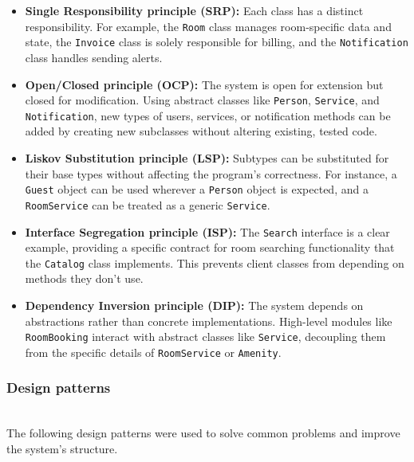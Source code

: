 \begin{itemize}
\item
\protect{}\label{SnXnbR9LHmyjL7LACTn7e}
\textbf{Single Responsibility principle (SRP):} Each class has a distinct responsibility. For example, the \texttt{Room} class manages room-specific data and state, the \texttt{Invoice} class is solely responsible for billing, and the \texttt{Notification} class handles sending alerts.
\item
\protect{}\label{GHGQq7Lh6XFKvBKaSGGWI}
\textbf{Open/Closed principle (OCP):} The system is open for extension but closed for modification. Using abstract classes like \texttt{Person}, \texttt{Service}, and \texttt{Notification}, new types of users, services, or notification methods can be added by creating new subclasses without altering existing, tested code.
\item
\protect{}\label{zhfsQJt4gRHvYn2bY6f1V}
\textbf{Liskov Substitution principle (LSP):} Subtypes can be substituted for their base types without affecting the program's correctness. For instance, a \texttt{Guest} object can be used wherever a \texttt{Person} object is expected, and a \texttt{RoomService} can be treated as a generic \texttt{Service}.
\item
\protect{}\label{eoXz1OrD4Ab_O52q99GH9}
\textbf{Interface Segregation principle (ISP):} The \texttt{Search} interface is a clear example, providing a specific contract for room searching functionality that the \texttt{Catalog} class implements. This prevents client classes from depending on methods they don't use.
\item
\protect{}\label{8_BNviDFkUqAMf9GWj9Ba}
\textbf{Dependency Inversion principle (DIP):} The system depends on abstractions rather than concrete implementations. High-level modules like \texttt{RoomBooking} interact with abstract classes like \texttt{Service}, decoupling them from the specific details of \texttt{RoomService} or \texttt{Amenity}.
\end{itemize}

\subsubsection{Design patterns}\label{vBpXlTdWZJ7PtcpiHNKW0}
\\
The following design patterns were used to solve common problems and improve the system's structure.

